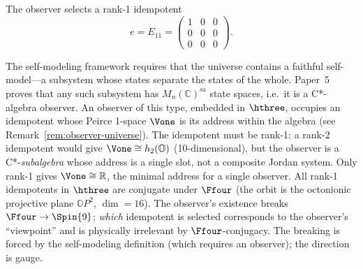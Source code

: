 The observer selects a rank-1 idempotent
\begin{equation}\label{eq:E11}
  e = E_{11} =
  \begin{pmatrix}
    1 & 0 & 0 \\
    0 & 0 & 0 \\
    0 & 0 & 0
  \end{pmatrix}.
\end{equation}

\begin{remark}\label{rem:gap-B1}
The self-modeling framework requires that the universe contains a
faithful self-model---a subsystem whose states separate the states of
the whole.  Paper~5 proves that any such subsystem has
$M_n(\mathbb{C})^{\mathrm{sa}}$ state spaces, i.e.\ it is a
C*-algebra observer.  An observer of this type, embedded in $\hthree$,
occupies an idempotent whose Peirce 1-space $\Vone$ is its address
within the algebra (see Remark~\ref{rem:observer-universe}).  The
idempotent must be rank-1: a rank-2 idempotent would give
$\Vone \cong h_2(\mathbb{O})$ (10-dimensional), but the observer
is a C*-\emph{subalgebra} whose address is a single slot, not a
composite Jordan system.  Only rank-1 gives
$\Vone \cong \mathbb{R}$, the minimal address for a single
observer.
All rank-1 idempotents in $\hthree$ are conjugate under
$\Ffour$ (the orbit is the octonionic projective plane
$\mathbb{O}P^2$, $\dim = 16$).  The observer's existence
breaks $\Ffour \to \Spin{9}$; \emph{which} idempotent is selected
corresponds to the observer's ``viewpoint'' and is physically
irrelevant by $\Ffour$-conjugacy.  The breaking is forced by the
self-modeling definition (which requires an observer); the direction
is gauge.
\end{remark}

